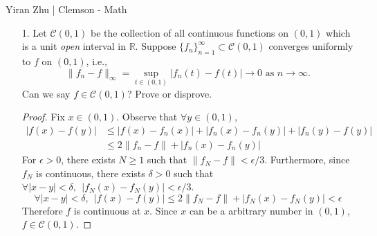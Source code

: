 		\begin{center}
			\normalsize{Yiran Zhu | Clemson - Math}
		\end{center}
\begin{itemize}
		\item[1.] Let $\mathcal{C}(0, 1)$ be the collection of all continuous functions on $(0, 1)$ which is a unit \textit{open} interval in $\mathbb{R}$. Suppose $\{f_n\}_{n=1}^\infty \subset \mathcal{C}(0, 1)$ converges uniformly to $f$ on $(0, 1)$, i.e.,
		$$\lVert f_n -f\rVert_\infty = \sup_{t\in (0,1)} |f_n(t)-f(t)| \rightarrow 0 \text{ as } n \rightarrow \infty.
		$$
		Can we say $f \in \mathcal{C}(0, 1)$? Prove or disprove.

		\begin{proof}
			Fix $x\in (0,1)$. Observe that $\forall y\in (0,1)$, 
			$$
			\begin{aligned}
			\lvert f(x) - f(y) \rvert &\le  \lvert f(x) - f_n(x) \rvert + \lvert f_n(x) - f_n(y) \rvert + \lvert f_n(y) - f(y)\rvert\\
			&\le 2\lVert f_n- f\rVert +  \lvert f_n(x) - f_n(y) \rvert 
			\end{aligned}
			$$
			For $\epsilon >0$, there exists $N\ge 1$ such that $\lVert f_N-f\rVert < \epsilon/3$. Furthermore, since $f_N$ is continuous, there exists $\delta >0$ such that $\forall \lvert x-y\rvert < \delta, ~~|f_N(x) - f_N(y)|<\epsilon/3$.
			$$
			\forall |x-y|< \delta, ~~\lvert f(x) - f(y) \rvert \le 2\lVert f_N- f\rVert +  \lvert f_N(x) - f_N(y) \rvert  < \epsilon
			$$
			Therefore $f$ is continuous at $x$. Since $x$ can be a arbitrary number in $(0,1)$, $f \in \mathcal{C}(0,1)$.
		\end{proof}
		

\end{itemize}
